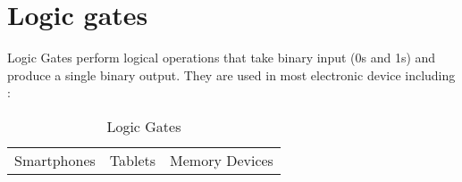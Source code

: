 \documentclass{article}
\begin{document}
	\section{Logic gates}
	Logic Gates perform logical operations that take binary input (0s and 1s) and produce a single binary output. They are used in most electronic device including :
	
	\begin{table}[h!]
		\begin{center}
		\caption{Logic Gates}
		\label{tab:table1}
		\begin{tabular}{l|c|c|}
			\hline
			Smartphones
			&
			Tablets
			&
			Memory Devices
			\\
		\end{tabular}
		\end{center}
	\end{table}
	
\end{document}
